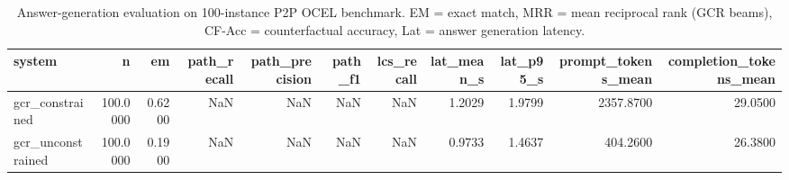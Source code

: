 \begin{table}
\caption{Answer-generation evaluation on 100-instance P2P OCEL benchmark. EM = exact match, MRR = mean reciprocal rank (GCR beams), CF-Acc = counterfactual accuracy, Lat = answer generation latency.}
\label{tab:answer_results}
\begin{tabular}{lrrrrrrrrrr}
\toprule
system & n & em & path_recall & path_precision & path_f1 & lcs_recall & lat_mean_s & lat_p95_s & prompt_tokens_mean & completion_tokens_mean \\
\midrule
gcr_constrained & 100.0000 & 0.6200 & NaN & NaN & NaN & NaN & 1.2029 & 1.9799 & 2357.8700 & 29.0500 \\
gcr_unconstrained & 100.0000 & 0.1900 & NaN & NaN & NaN & NaN & 0.9733 & 1.4637 & 404.2600 & 26.3800 \\
\bottomrule
\end{tabular}
\end{table}
